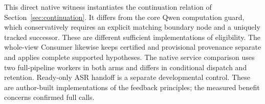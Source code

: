 This direct native witness instantiates the continuation relation of
Section~\ref{sec:continuation}. It differs from the core Qwen computation
guard, which conservatively requires an explicit matching boundary node and
a uniquely tracked successor. These are different sufficient implementations
of eligibility. The whole-view Consumer likewise keeps certified and
provisional provenance separate and applies complete supported hypotheses.
The native service comparison uses two full-pipeline workers in both arms
and differs in conditional dispatch and retention. Ready-only ASR handoff
is a separate developmental control. These are author-built implementations
of the feedback principles; the measured benefit concerns confirmed full calls.
